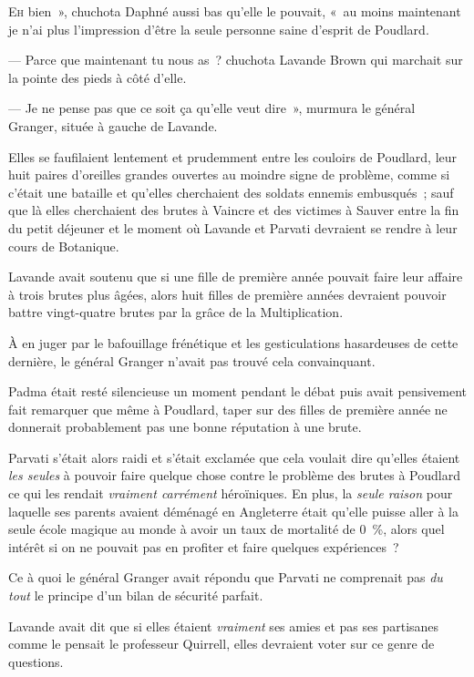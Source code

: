
\lettrine[ante=«~]{E}{h} bien~», chuchota Daphné aussi bas qu'elle le pouvait, «~au moins maintenant je n'ai plus l'impression d'être la seule personne saine d'esprit de Poudlard.

--- Parce que maintenant tu nous as~? chuchota Lavande Brown qui marchait sur la pointe des pieds à côté d'elle.

--- Je ne pense pas que ce soit ça qu'elle veut dire~», murmura le général Granger, située à gauche de Lavande.

Elles se faufilaient lentement et prudemment entre les couloirs de Poudlard, leur huit paires d'oreilles grandes ouvertes au moindre signe de problème, comme si c'était une bataille et qu'elles cherchaient des soldats ennemis embusqués~; sauf que là elles cherchaient des brutes à Vaincre et des victimes à Sauver entre la fin du petit déjeuner et le moment où Lavande et Parvati devraient se rendre à leur cours de Botanique.

Lavande avait soutenu que si une fille de première année pouvait faire leur affaire à trois brutes plus âgées, alors huit filles de première années devraient pouvoir battre vingt-quatre brutes par la grâce de la Multiplication.

À en juger par le bafouillage frénétique et les gesticulations hasardeuses de cette dernière, le général Granger n'avait pas trouvé cela convainquant.

Padma était resté silencieuse un moment pendant le débat puis avait pensivement fait remarquer que même à Poudlard, taper sur des filles de première année ne donnerait probablement pas une bonne réputation à une brute.

Parvati s'était alors raidi et s'était exclamée que cela voulait dire qu'elles étaient \emph{les seules} à pouvoir faire quelque chose contre le problème des brutes à Poudlard ce qui les rendait \emph{vraiment carrément} héroïniques.
En plus, la \emph{seule raison} pour laquelle ses parents avaient déménagé en Angleterre était qu'elle puisse aller à la seule école magique au monde à avoir un taux de mortalité de 0~\%, alors quel intérêt si on ne pouvait pas en profiter et faire quelques expériences~?

Ce à quoi le général Granger avait répondu que Parvati ne comprenait pas \emph{du tout} le principe d'un bilan de sécurité parfait.

Lavande avait dit que si elles étaient \emph{vraiment} ses amies et pas ses partisanes comme le pensait le professeur Quirrell, elles devraient voter sur ce genre de questions.

